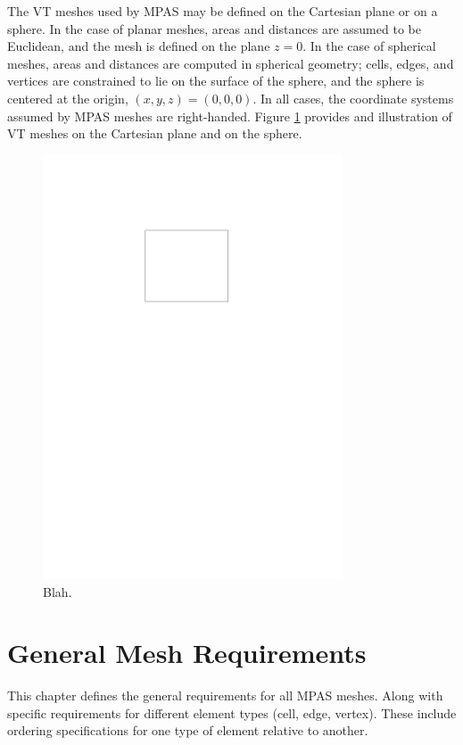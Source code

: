 \documentclass[11pt]{report}
\begin{document}
The VT meshes used by MPAS may be defined on the Cartesian plane or on a
sphere. In the case of planar meshes, areas and distances are assumed to be
Euclidean, and the mesh is defined on the plane $z=0$. In the case of spherical
meshes, areas and distances are computed in spherical geometry; cells, edges,
and vertices are constrained to lie on the surface of the sphere, and the
sphere is centered at the origin, $(x,y,z)=(0,0,0)$. In all cases, the
coordinate systems assumed by MPAS meshes are right-handed. Figure
\ref{fig:planar_spherical} provides and illustration of VT meshes on the
Cartesian plane and on the sphere.

\begin{figure}[htb]
\begin{center}
\includegraphics[width=3.5in]{figures/blank_figure.pdf}
\caption{Blah.}
\label{fig:planar_spherical}
\end{center}
\end{figure}


\chapter{General Mesh Requirements}

This chapter defines the general requirements for all MPAS meshes. Along with specific requirements for different element types (cell, edge, vertex). These include ordering specifications for one type of element relative to another.
\end{document}
